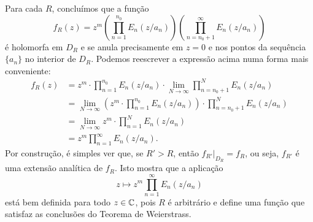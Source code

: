     Para cada $R$, concluímos que a função 
    \[
    f_R (z) = z^m\left(\prod_{n=1}^{n_0}E_n(z/a_n)\right)\left(\prod_{n=n_0 + 1}^{\infty}E_n(z/a_n)\right)
    \]
    é holomorfa em $D_R$ e se anula precisamente em $z = 0$ 
    e nos pontos da sequência $\{a_n\}$ no interior de $D_R$. 
    Podemos reescrever a expressão acima numa forma mais conveniente:
    \begin{align*}
        f_R (z) &= z^m \cdot \prod_{n=1}^{n_0}E_n(z/a_n) \cdot \lim_{N \to \infty}\prod_{n=n_0 + 1}^{N}E_n(z/a_n) \\
        &= \lim_{N \to \infty} \left( z^m \cdot \prod_{n=1}^{n_0}E_n(z/a_n) \right) \cdot \prod_{n=n_0 + 1}^{N}E_n(z/a_n) \\
        &= \lim_{N \to \infty}  z^m \cdot \prod_{n=1}^{N}E_n(z/a_n) \\
        &= z^m \prod_{n=1}^{\infty}E_n(z/a_n).
    \end{align*}
    Por construção, é simples ver que, se $R'>R$, então 
    $f_{R'}|_{D_R} = f_R$, ou seja, $f_{R'}$ 
    é uma extensão analítica de $f_R$. Isto mostra que a aplicação
    \[
    z \mapsto z^m \prod_{n=1}^{\infty}E_n(z/a_n)
    \]
    está bem definida para todo $z \in \mathbb{C}$, pois $R$ é arbitrário 
    e define uma função que satisfaz as conclusões do Teorema de Weierstrass.
    
